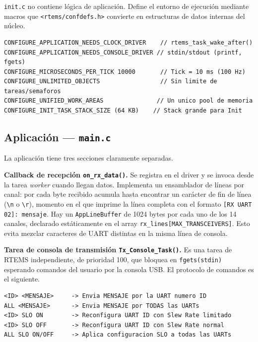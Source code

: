 \texttt{init.c} no contiene lógica de aplicación. Define el entorno de ejecución mediante macros
que \texttt{<rtems/confdefs.h>} convierte en estructuras de datos internas del núcleo.

\begin{lstlisting}[style=terminal, caption={Configuración estática de RTEMS en init.c}]
CONFIGURE_APPLICATION_NEEDS_CLOCK_DRIVER    // rtems_task_wake_after()
CONFIGURE_APPLICATION_NEEDS_CONSOLE_DRIVER // stdin/stdout (printf, fgets)
CONFIGURE_MICROSECONDS_PER_TICK 10000       // Tick = 10 ms (100 Hz)
CONFIGURE_UNLIMITED_OBJECTS                 // Sin limite de tareas/semaforos
CONFIGURE_UNIFIED_WORK_AREAS               // Un unico pool de memoria
CONFIGURE_INIT_TASK_STACK_SIZE (64 KB)    // Stack grande para Init
\end{lstlisting}

\subsection{Aplicación --- \texttt{main.c}}

La aplicación tiene tres secciones claramente separadas.

\textbf{Callback de recepción \texttt{on\_rx\_data()}.} Se registra en el driver y se invoca desde
la tarea \textit{worker} cuando llegan datos. Implementa un ensamblador de líneas por canal: por
cada byte recibido acumula hasta encontrar un carácter de fin de línea (\verb|\n| o \verb|\r|),
momento en el que imprime la línea completa con el formato \texttt{[RX UART 02]: mensaje}. Hay un
\texttt{AppLineBuffer} de 1024 bytes por cada uno de los 14 canales, declarado estáticamente en el
array \texttt{rx\_lines[MAX\_TRANSCEIVERS]}. Esto evita mezclar caracteres de UART distintas en la
misma línea de consola.

\textbf{Tarea de consola de transmisión \texttt{Tx\_Console\_Task()}.} Es una tarea de RTEMS
independiente, de prioridad 100, que bloquea en \texttt{fgets(stdin)} esperando comandos del
usuario por la consola USB. El protocolo de comandos es el siguiente.

\begin{lstlisting}[caption={Protocolo de comandos de la aplicación de testing}]
<ID> <MENSAJE>     -> Envia MENSAJE por la UART numero ID
ALL <MENSAJE>      -> Envia MENSAJE por TODAS las UARTs
<ID> SLO ON        -> Reconfigura UART ID con Slew Rate limitado
<ID> SLO OFF       -> Reconfigura UART ID con Slew Rate normal
ALL SLO ON/OFF     -> Aplica configuracion SLO a todas las UARTs
\end{lstlisting}

